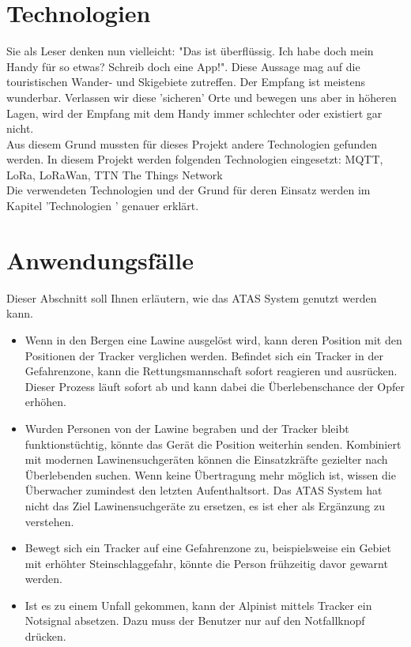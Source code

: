 \documentclass[11pt,english,german]{report}
\theoremstyle{definition}
\begin{document}
\section{Technologien}
Sie als Leser denken nun vielleicht: "Das ist überflüssig. Ich habe doch mein Handy für so etwas? Schreib doch eine App!". Diese Aussage mag auf die touristischen Wander- und Skigebiete zutreffen. Der Empfang ist meistens wunderbar. Verlassen wir diese 'sicheren' Orte und bewegen uns aber in höheren Lagen, wird der Empfang mit dem Handy immer schlechter oder existiert gar nicht. \bigskip \\
Aus diesem Grund mussten für dieses Projekt andere Technologien gefunden werden. In diesem Projekt werden folgenden Technologien eingesetzt:
\gls{MQTT}, \gls{LoRa}, \gls{LoRaWan}, \gls{TTN} The Things Network\bigskip \\
Die verwendeten Technologien und der Grund für deren Einsatz werden im Kapitel 'Technologien ' genauer erklärt.

\section{Anwendungsfälle}
Dieser Abschnitt soll Ihnen erläutern, wie das ATAS System genutzt werden kann.
\begin{itemize}
	\item 
	Wenn in den Bergen eine Lawine ausgelöst wird, kann deren Position mit den Positionen der Tracker verglichen werden. Befindet sich ein Tracker in der Gefahrenzone, kann die Rettungsmannschaft sofort reagieren und ausrücken. Dieser Prozess läuft sofort ab und kann dabei die Überlebenschance der Opfer erhöhen. 
	\item 
	Wurden Personen von der Lawine begraben und der Tracker bleibt funktionstüchtig, könnte das Gerät die Position weiterhin senden. Kombiniert mit modernen Lawinensuchgeräten können die Einsatzkräfte gezielter nach Überlebenden suchen. Wenn keine Übertragung mehr möglich ist, wissen die Überwacher zumindest den letzten Aufenthaltsort. Das ATAS System hat nicht das Ziel Lawinensuchgeräte zu ersetzen, es ist eher als Ergänzung zu verstehen. 
	\item 
	Bewegt sich  ein Tracker auf eine Gefahrenzone zu, beispielsweise ein Gebiet mit erhöhter Steinschlaggefahr, könnte die Person frühzeitig davor gewarnt werden. 
	\item 
	Ist es zu einem Unfall gekommen, kann der Alpinist mittels Tracker ein Notsignal absetzen. Dazu muss der Benutzer nur auf den Notfallknopf drücken.
\end{itemize}
\end{document}
